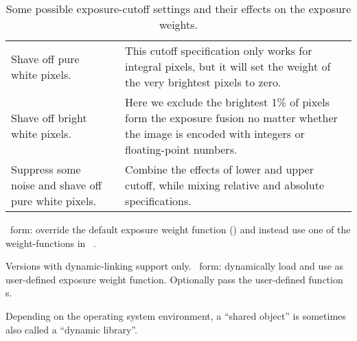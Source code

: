 \begin{codelist}
\begin{table}
\begin{maxipage}
\begin{tabular}{p{.3\linewidth}lp{.3\linewidth}}
        Shave off pure white pixels. & \option{--exposure-cutoff=0:-1} & This cutoff
        specification only works for integral pixels, but it will set the weight of the very
        brightest pixels to zero. \\

        Shave off bright white pixels. & \option{--exposure-cutoff=0:-1\%} & Here we exclude the
        brightest 1\% of pixels form the exposure fusion no matter whether the image is encoded
        with integers or floating-point numbers. \\

        Suppress some noise and shave off pure white pixels. & \option{--exposure-cutoff=5\%:-1}
        & Combine the effects of lower and upper cutoff, while mixing relative and absolute
        specifications.
      \end{tabular}
    \end{maxipage}

    \caption[Flexible exposure cutoff]{\label{tab:flexible-exposure-cutoff}%
      Some possible exposure-cutoff settings and their effects on the exposure weights.}
  \end{table}


  \label{opt:exposure-weight-function}%
\item[\itempar{--exposure-weight-function=\metavar{WEIGHT-FUNCTION}~\textrm{(\oldstylefirst~form)}
    \\ --exposure-weight-function=\metavar{SHARED-OBJECT}:\feasiblebreak
    \metavar{SYMBOL}\optional{:\feasiblebreak
      \metavar{ARGUMENT}\optional{:\dots}}~\textrm{(\oldstylesecond~form)}}]\itemend
  \oldstylefirst~form: override the default exposure weight function
  () and instead use one of the weight-functions in
  \tableName~.

  \begin{restrictedmaterial}{Versions with dynamic-linking support only.}
    \noindent \oldstylesecond~form: dynamically load  and use
     as user-defined exposure weight function.  Optionally pass the user-defined
    function s.

    \begin{geeknote}
      Depending on the operating system environment, a ``shared object'' is sometimes also called
      a ``dynamic library''.
    \end{geeknote}
  \end{restrictedmaterial}


\end{codelist}
